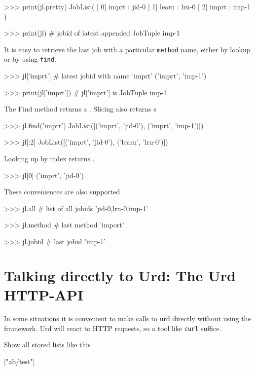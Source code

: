 \begin{pythonMID}
>>> print(jl.pretty)
JobList(
   [  0]  imprt : jid-0
   [  1]  learn : lrn-0
   [  2]  imprt : imp-1
)

>>>  print(jl)  # jobid of latest appended JobTuple
imp-1
\end{pythonMID}

It is easy to retrieve the last job with a particular \texttt{method}
name, either by lookup or by using \texttt{find}.

\begin{pythonMID}
>>> jl['imprt']         # latest jobid with name 'imprt'
('imprt', 'imp-1')

>>> print(jl['imprt'])   # jl['imprt'] is JobTuple
imp-1
\end{pythonMID}
The Find method returns a \joblist.  Slicing also returns {\joblist}s

\begin{pythonMID}
>>> jl.find('imprt')
JobList([('imprt', 'jid-0'), ('imprt', 'imp-1')])

>>> jl[:2]
JobList([('imprt', 'jid-0'), ('learn', 'lrn-0')])
\end{pythonMID}
Looking up by index returns \jobtuple.

\begin{pythonMID}
>>> jl[0]
('imprt', 'jid-0')
\end{pythonMID}
These conveniences are also supported

\begin{pythonEND}
>>> jl.all              # list of all jobids
'jid-0,lrn-0,imp-1'

>>> jl.method           # last method
'import'

>>> jl.jobid            # last jobid
'imp-1'
\end{pythonEND}



\newpage
\section{Talking directly to Urd:  The Urd HTTP-API}

In some situations it is convenient to make calls to urd directly
without using the framework.  Urd will react to HTTP requests, so a
tool like \texttt{curl} suffice.

\noindent Show all stored lists like this
\begin{shell}
["ab/test"]
\end{shell}

